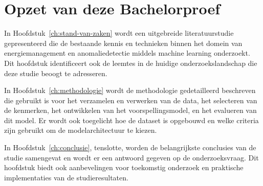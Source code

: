 \section{Opzet van deze Bachelorproef}
In Hoofdstuk~\ref{ch:stand-van-zaken} wordt een uitgebreide literatuurstudie gepresenteerd die de bestaande kennis en technieken binnen het domein van energiemanagement en anomaliedetectie middels machine learning onderzoekt. Dit hoofdstuk identificeert ook de leemtes in de huidige onderzoekslandschap die deze studie beoogt te adresseren.

In Hoofdstuk~\ref{ch:methodologie} wordt de methodologie gedetailleerd beschreven die gebruikt is voor het verzamelen en verwerken van de data, het selecteren van de kenmerken, het ontwikkelen van het voorspellingsmodel, en het evalueren van dit model. Er wordt ook toegelicht hoe de dataset is opgebouwd en welke criteria zijn gebruikt om de modelarchitectuur te kiezen.

In Hoofdstuk~\ref{ch:conclusie}, tenslotte, worden de belangrijkste conclusies van de studie samengevat en wordt er een antwoord gegeven op de onderzoeksvraag. Dit hoofdstuk biedt ook aanbevelingen voor toekomstig onderzoek en praktische implementaties van de studieresultaten.
